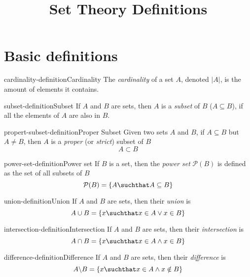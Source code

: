 \documentclass[preview]{standalone}
\begin{document}
\title{Set Theory Definitions}
\genpage


\section{Basic definitions}

\begin{snippetdefinition}{cardinality-definition}{Cardinality}
    The \textit{cardinality} of a set \(A\), denoted \(|A|\),
    is the amount of elements it contains.
\end{snippetdefinition}

\begin{snippetdefinition}{subset-definition}{Subset}
    If \(A\) and \(B\) are sets, then \(A\) is a \textit{subset} of \(B\)
    (\(A\subseteq B\)), if all the elements of \(A\) are also in \(B\).
\end{snippetdefinition}

\begin{snippetdefinition}{propert-subset-definition}{Proper Subset}
    Given two sets \(A\) and \(B\), if \(A \subseteq B\) but \(A \neq B\),
    then \(A\) is a \textit{proper} (or \textit{strict}) subset of \(B\)
    \[
        A \subset B
    \]
\end{snippetdefinition}

\begin{snippetdefinition}{power-set-definition}{Power set}
    If \(B\) is a set, then the \textit{power set} \(\mathcal{P}(B)\)
    is defined as the set of all subsets of \(B\)
    \[
        \mathcal{P}(B)=\{A \suchthat A\subseteq B\}
    \]
\end{snippetdefinition}

\begin{snippetdefinition}{union-definition}{Union}
    If \(A\) and \(B\) are sets, then their \textit{union} is
    \[
        A \cup B = \{x \suchthat x \in A \lor x \in B\}
    \]
\end{snippetdefinition}

\begin{snippetdefinition}{intersection-definition}{Intersection}
    If \(A\) and \(B\) are sets, then their \textit{intersection} is
    \[
        A \cap B = \{x \suchthat x \in A \land x \in B\}
    \]
\end{snippetdefinition}

\begin{snippetdefinition}{difference-definition}{Difference}
    If \(A\) and \(B\) are sets, then their \textit{difference} is
    \[
        A \backslash B = \{x \suchthat x \in A \land x \notin B\}
    \]
\end{snippetdefinition}
\end{document}
